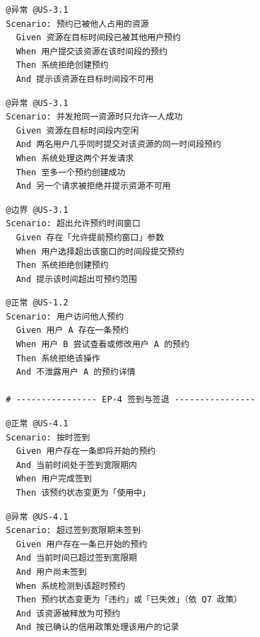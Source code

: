 \documentclass[11pt,a4paper]{article}
\begin{document}
\begin{framed}
\small
\begin{verbatim}
  @异常 @US-3.1
  Scenario: 预约已被他人占用的资源
    Given 资源在目标时间段已被其他用户预约
    When 用户提交该资源在该时间段的预约
    Then 系统拒绝创建预约
    And 提示该资源在目标时间段不可用
\end{verbatim}
\end{framed}

\begin{framed}
\small
\begin{verbatim}
  @异常 @US-3.1
  Scenario: 并发抢同一资源时只允许一人成功
    Given 资源在目标时间段内空闲
    And 两名用户几乎同时提交对该资源的同一时间段预约
    When 系统处理这两个并发请求
    Then 至多一个预约创建成功
    And 另一个请求被拒绝并提示资源不可用
\end{verbatim}
\end{framed}

\begin{framed}
\small
\begin{verbatim}
  @边界 @US-3.1
  Scenario: 超出允许预约时间窗口
    Given 存在「允许提前预约窗口」参数
    When 用户选择超出该窗口的时间段提交预约
    Then 系统拒绝创建预约
    And 提示该时间超出可预约范围
\end{verbatim}
\end{framed}

\begin{framed}
\small
\begin{verbatim}
  @正常 @US-1.2
  Scenario: 用户访问他人预约
    Given 用户 A 存在一条预约
    When 用户 B 尝试查看或修改用户 A 的预约
    Then 系统拒绝该操作
    And 不泄露用户 A 的预约详情

  # ---------------- EP-4 签到与签退 ----------------
\end{verbatim}
\end{framed}

\begin{framed}
\small
\begin{verbatim}
  @正常 @US-4.1
  Scenario: 按时签到
    Given 用户存在一条即将开始的预约
    And 当前时间处于签到宽限期内
    When 用户完成签到
    Then 该预约状态变更为「使用中」
\end{verbatim}
\end{framed}

\begin{framed}
\small
\begin{verbatim}
  @异常 @US-4.1
  Scenario: 超过签到宽限期未签到
    Given 用户存在一条已开始的预约
    And 当前时间已超过签到宽限期
    And 用户尚未签到
    When 系统检测到该超时预约
    Then 预约状态变更为「违约」或「已失效」（依 Q7 政策）
    And 该资源被释放为可预约
    And 按已确认的信用政策处理该用户的记录
\end{verbatim}
\end{framed}
\end{document}
